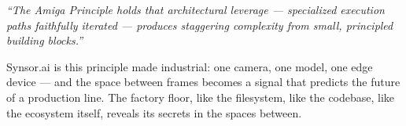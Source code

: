 \documentclass[11pt,letterpaper]{article}
\begin{document}
\vspace{1em}

\begin{quotebox}
\textit{``The Amiga Principle holds that architectural leverage --- specialized execution paths faithfully iterated --- produces staggering complexity from small, principled building blocks.''}

\vspace{0.5em}

Synsor.ai is this principle made industrial: one camera, one model, one edge device --- and the space between frames becomes a signal that predicts the future of a production line. The factory floor, like the filesystem, like the codebase, like the ecosystem itself, reveals its secrets in the spaces between.
\end{quotebox}
\end{document}
